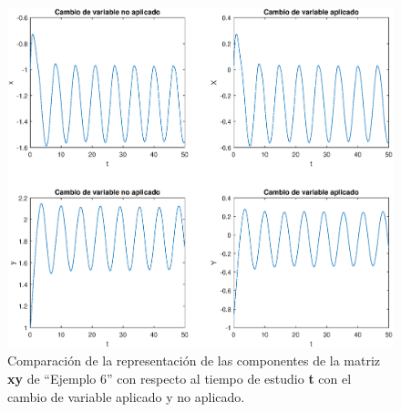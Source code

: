 \documentclass[12pt,a4paper]{report} %
\begin{document}
    \newpage
    
    \begin{figure}[h]
    	\centering
    	\includegraphics[width=1\textwidth]{g2ejem6.eps}
    	\caption{Comparación de la representación de las componentes de la matriz \textbf{xy} de ``Ejemplo 6'' con respecto al tiempo de estudio \textbf{t} con el cambio de variable aplicado y no aplicado.}
    	\label{fig:g2ejem6}
    \end{figure}\smallskip
	
	
	\newpage
	
\end{document}
